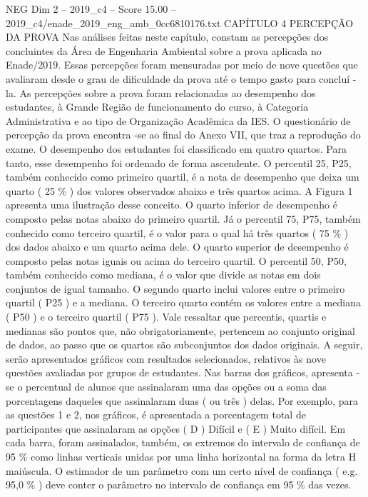 \begin{textsample}{NEG Dim 2 – 2019\_c4 – Score 15.00 – 2019\_c4/enade\_2019\_eng\_amb\_0cc6810176.txt}  \label{ex:f2_neg_393}
CAPÍTULO 4 PERCEPÇÃO DA PROVA Nas análises feitas neste capítulo, constam as percepções dos concluintes da Área de Engenharia Ambiental sobre a prova aplicada no Enade/2019.
Essas percepções foram mensuradas por meio de nove questões que avaliaram desde o grau de dificuldade da prova até o tempo gasto para concluí -la.
As percepções sobre a prova foram relacionadas ao desempenho dos estudantes, à Grande Região de funcionamento do curso, à Categoria Administrativa e ao tipo de Organização Acadêmica da IES.
O questionário de percepção da prova encontra -se ao final do Anexo VII, que traz a reprodução do exame.
O desempenho dos estudantes foi classificado em quatro quartos.
Para tanto, esse desempenho foi ordenado de forma ascendente.
O percentil 25, P25, também conhecido como primeiro quartil, é a nota de desempenho que deixa um quarto ( 25 \% ) dos valores observados abaixo e três quartos acima.
A Figura 1 apresenta uma ilustração desse conceito.
O quarto inferior de desempenho é composto pelas notas abaixo do primeiro quartil.
Já o percentil 75, P75, também conhecido como terceiro quartil, é o valor para o qual há três quartos ( 75 \% ) dos dados abaixo e um quarto acima dele.
O quarto superior de desempenho é composto pelas notas iguais ou acima do terceiro quartil.
O percentil 50, P50, também conhecido como mediana, é o valor que divide as notas em dois conjuntos de igual tamanho.
O segundo quarto inclui valores entre o primeiro quartil ( P25 ) e a mediana.
O terceiro quarto contém os valores entre a mediana ( P50 ) e o terceiro quartil ( P75 ).
Vale ressaltar que percentis, quartis e medianas são pontos que, não obrigatoriamente, pertencem ao conjunto original de dados, ao passo que os quartos são subconjuntos dos dados originais.
A seguir, serão apresentados gráficos com resultados selecionados, relativos às nove questões avaliadas por grupos de estudantes.
Nas barras dos gráficos, apresenta -se o percentual de alunos que assinalaram uma das opções ou a soma das porcentagens daqueles que assinalaram duas ( ou três ) delas.
Por exemplo, para as questões 1 e 2, nos gráficos, é apresentada a porcentagem total de participantes que assinalaram as opções ( D ) Difícil e ( E ) Muito difícil.
Em cada barra, foram assinalados, também, os extremos do intervalo de confiança de 95 \% como linhas verticais unidas por uma linha horizontal na forma da letra H maiúscula.
O estimador de um parâmetro com um certo nível de confiança ( e.g. 95,0 \% ) deve conter o parâmetro no intervalo de confiança em 95 \% das vezes.

\end{textsample}
